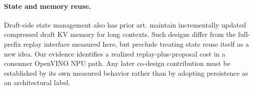 \paragraph{State and memory reuse.}
Draft-side state management also has prior art. \citet{compactmemory} maintain incrementally updated compressed draft KV memory for long contexts. Such designs differ from the full-prefix replay interface measured here, but preclude treating state reuse itself as a new idea. Our evidence identifies a realized replay-plus-proposal cost in a consumer OpenVINO NPU path. Any later co-design contribution must be established by its own measured behavior rather than by adopting persistence as an architectural label.
